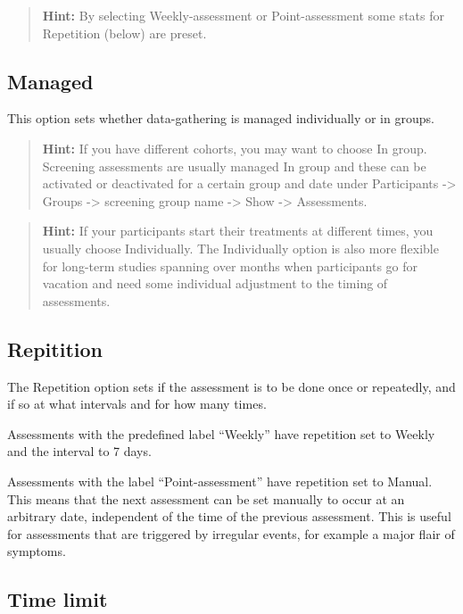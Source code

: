 \documentclass[]{book}
\begin{document}
\begin{quote}
\textbf{Hint:} By selecting Weekly-assessment or Point-assessment some stats for Repetition (below) are preset.
\end{quote}

\hypertarget{managed}{%
\subsection{Managed}\label{managed}}

This option sets whether data-gathering is managed individually or in groups.

\begin{quote}
\textbf{Hint:} If you have different cohorts, you may want to choose In group. Screening assessments are usually managed In group and these can be activated or deactivated for a certain group and date under Participants -\textgreater{} Groups -\textgreater{} screening group name -\textgreater{} Show -\textgreater{} Assessments.
\end{quote}

\begin{quote}
\textbf{Hint:} If your participants start their treatments at different times, you usually choose Individually. The Individually option is also more flexible for long-term studies spanning over months when participants go for vacation and need some individual adjustment to the timing of assessments.
\end{quote}

\hypertarget{repitition}{%
\subsection{Repitition}\label{repitition}}

The Repetition option sets if the assessment is to be done once or repeatedly, and if so at what intervals and for how many times.

Assessments with the predefined label ``Weekly'' have repetition set to Weekly and the interval to 7 days.

Assessments with the label ``Point-assessment'' have repetition set to Manual. This means that the next assessment can be set manually to occur at an arbitrary date, independent of the time of the previous assessment. This is useful for assessments that are triggered by irregular events, for example a major flair of symptoms.

\hypertarget{time-limit}{%
\subsection{Time limit}\label{time-limit}}
\end{document}
